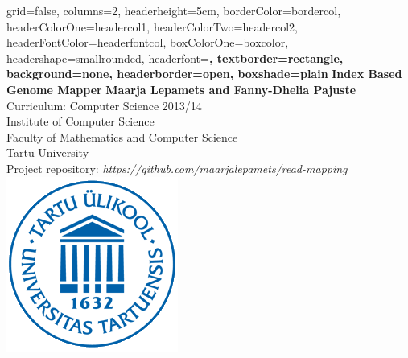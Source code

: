 \documentclass[portrait, a0paper, margin=7cm]{baposter}
\begin{document}

\begin{poster}{
grid=false,
columns=2,
headerheight=5cm,
borderColor=bordercol, %
headerColorOne=headercol1, %
headerColorTwo=headercol2, %
headerFontColor=headerfontcol, %
boxColorOne=boxcolor, %
headershape=smallrounded, %
headerfont=\Large\sf\bf{}\selectfont, %
textborder=rectangle,
background=none,
headerborder=open, %
boxshade=plain
}
{}
%
%
{\sf\bf{}\selectfont Index Based Genome Mapper} %
	{\vspace{1em}\textbf{Maarja Lepamets and Fanny-Dhelia Pajuste}\\[0.4cm] %
	{\smaller 
	Curriculum: Computer Science 2013/14\\	
	Institute of Computer Science\\
		Faculty of Mathematics and Computer Science\\
	 Tartu University\\[0.4cm]
	 Project repository: \Large \textit{https://github.com/maarjalepamets/read-mapping}}
} %
%
{\includegraphics[scale=0.6]{ut}} %



\end{poster}
\end{document}
